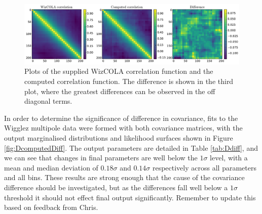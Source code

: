 \documentclass[titlesmallcaps, examinerscopy, copyrightpage]{uqthesis}
\newcommand{\red}{\color{red}}
\begin{document}
\begin{appendices}
\begin{figure}[h!]
  \begin{center}
    \includegraphics[width=\textwidth]{images/fullCorrelationDifferences.pdf}
  \end{center}
  \caption{Plots of the supplied WizCOLA correlation function and the computed correlation function. The difference is shown in the third plot, where the greatest differences can be observed in the off diagonal terms.}
  \label{fig:DfullCorrelationDifferences}
\end{figure}

In order to determine the significance of difference in covariance, fits to the Wigglez multipole data were formed with both covariance matrices, with the output marginalised distributions and likelihood surfaces shown in Figure \ref{fig:DcomputedDiff}. The output parameters are detailed in Table \ref{tab:Ddiff}, and we can see that changes in final parameters are well below the $1\sigma$ level, with a mean and median deviation of $0.18\sigma$ and $0.14\sigma$ respectively across all parameters and all bins. These results are strong enough that the cause of the covariance difference should be investigated, but as the differences fall well below a $1\sigma$ threshold it should not effect final output significantly. {\red Remember to update this based on feedback from Chris.}



\end{appendices}
\end{document}
